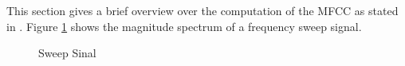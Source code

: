 This section gives a brief overview over the computation of the MFCC as stated in \cite[pp. 55ff]{knees1}.
Figure \ref{sweep} shows the magnitude spectrum of a frequency sweep signal.
\begin{figure}[htbp]
	\centering
	\caption{Sweep Sinal}	
	\label{sweep}
\end{figure}
